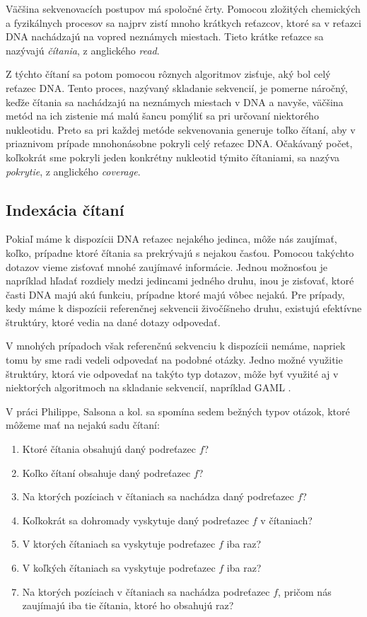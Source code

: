 Väčšina sekvenovacích postupov má spoločné črty. Pomocou zložitých chemických
a fyzikálnych procesov sa najprv zistí mnoho krátkych reťazcov, ktoré sa
v reťazci DNA nachádzajú na vopred neznámych miestach. Tieto krátke reťazce
sa nazývajú \emph{čítania}, z anglického \emph{read}.

Z týchto čítaní sa potom pomocou rôznych algoritmov zisťuje, aký bol celý reťazec DNA.
Tento proces, nazývaný skladanie sekvencií, je pomerne náročný, keďže čítania sa nachádzajú na neznámych miestach
v DNA a navyše, väčšina metód na ich zistenie má malú šancu pomýliť sa pri určovaní
niektorého nukleotidu. Preto sa pri každej metóde sekvenovania generuje toľko čítaní, aby
v priaznivom prípade mnohonásobne pokryli celý reťazec DNA. Očakávaný počet, koľkokrát
sme pokryli jeden konkrétny nukleotid týmito čítaniami, sa nazýva \emph{pokrytie},
z anglického \emph{coverage}.

\subsection{Indexácia čítaní}

Pokiaľ máme k dispozícii DNA reťazec nejakého jedinca, môže nás zaujímať, koľko, prípadne
ktoré čítania sa prekrývajú s nejakou časťou. Pomocou takýchto dotazov vieme zisťovať
mnohé zaujímavé informácie. Jednou možnosťou je napríklad hľadať rozdiely medzi
jedincami jedného druhu, inou je zisťovať, ktoré časti DNA majú akú funkciu, prípadne
ktoré majú vôbec nejakú. Pre prípady, kedy máme k dispozícii referenčnej sekvencii živočíšneho
druhu, existujú efektívne štruktúry, ktoré vedia na dané dotazy odpovedať.

V mnohých prípadoch však referenčnú sekvenciu k dispozícii nemáme, napriek tomu by sme
radi vedeli odpovedať na podobné otázky. Jedno možné využitie štruktúry, ktorá vie
odpovedať na takýto typ dotazov, môže byť využité aj v niektorých algoritmoch na
skladanie sekvencií, napríklad GAML \cite{gaml}.

V práci Philippe, Salsona a kol. \cite{gk_arrays} sa spomína sedem bežných typov otázok,
ktoré môžeme mať na nejakú sadu čítaní:

\begin{enumerate}
    \item Ktoré čítania obsahujú daný podreťazec $f$?
    \item Koľko čítaní obsahuje daný podreťazec $f$?
    \item Na ktorých pozíciach v čítaniach sa nachádza daný podreťazec $f$?
    \item Koľkokrát sa dohromady vyskytuje daný podreťazec $f$ v čítaniach?
    \item V ktorých čítaniach sa vyskytuje podreťazec $f$ iba raz?
    \item V koľkých čítaniach sa vyskytuje podreťazec $f$ iba raz?
    \item Na ktorých pozíciach v čítaniach sa nachádza podreťazec $f$, pričom nás
    zaujímajú iba tie čítania, ktoré ho obsahujú raz?
\end{enumerate}

